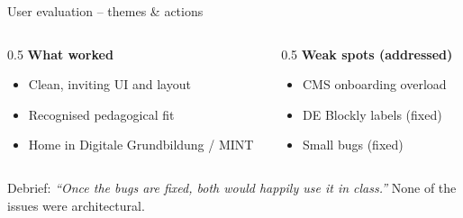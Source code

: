 \documentclass[11pt,t,usepdftitle=false,aspectratio=169]{beamer}
\begin{document}
\begin{frame}{User evaluation -- themes \& actions}
  \begin{columns}[T]
    \begin{column}{0.5\textwidth}
      \textbf{What worked}
      \begin{itemize}
        \item Clean, inviting UI and layout
        \item Recognised pedagogical fit
        \item Home in Digitale Grundbildung / MINT
      \end{itemize}
    \end{column}
    \begin{column}{0.5\textwidth}
      \textbf{Weak spots (addressed)}
      \begin{itemize}
        \item CMS onboarding overload
        \item DE Blockly labels (fixed)
        \item Small bugs (fixed)
      \end{itemize}
    \end{column}
  \end{columns}
  \vspace{0.5cm}
  {\footnotesize Debrief: \emph{``Once the bugs are fixed, both would happily use it in class.''}
    None of the issues were architectural.}
\end{frame}
\end{document}
